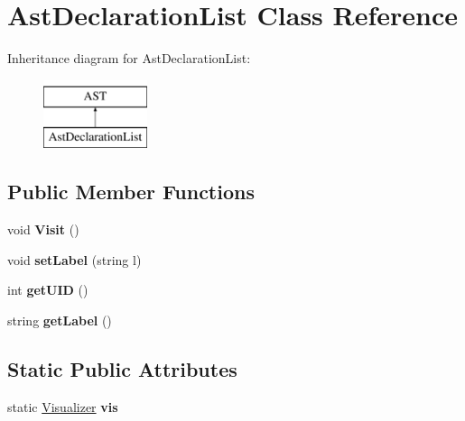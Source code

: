 \hypertarget{classAstDeclarationList}{\section{Ast\-Declaration\-List Class Reference}
\label{classAstDeclarationList}
}
Inheritance diagram for Ast\-Declaration\-List\-:\begin{figure}[H]
\begin{center}
\leavevmode
\includegraphics[height=2.000000cm]{classAstDeclarationList}
\end{center}
\end{figure}
\subsection*{Public Member Functions}
\begin{DoxyCompactItemize}
\item 
\hypertarget{classAstDeclarationList_a1c98628f55a26aabfacbbb670d2eac12}{void {\bfseries Visit} ()}\label{classAstDeclarationList_a1c98628f55a26aabfacbbb670d2eac12}

\item 
\hypertarget{classAST_a71d680856e95ff89f55d5311a552eba6}{void {\bfseries set\-Label} (string l)}\label{classAST_a71d680856e95ff89f55d5311a552eba6}

\item 
\hypertarget{classAST_ab7a5b1d9f1c2de0d98deb356f724a42c}{int {\bfseries get\-U\-I\-D} ()}\label{classAST_ab7a5b1d9f1c2de0d98deb356f724a42c}

\item 
\hypertarget{classAST_aee029be902fffc927d16ccb03eb922ad}{string {\bfseries get\-Label} ()}\label{classAST_aee029be902fffc927d16ccb03eb922ad}

\end{DoxyCompactItemize}
\subsection*{Static Public Attributes}
\begin{DoxyCompactItemize}
\item 
\hypertarget{classAST_aca9e6637209b31e03a09c0d42f29bdfa}{static \hyperlink{classVisualizer}{Visualizer} {\bfseries vis}}\label{classAST_aca9e6637209b31e03a09c0d42f29bdfa}

\end{DoxyCompactItemize}
